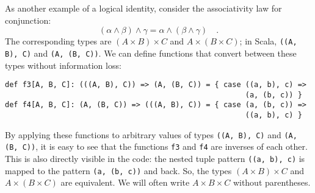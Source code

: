 As another example of a logical identity, consider the associativity
law for conjunction:
\begin{equation}
\left(\alpha\wedge\beta\right)\wedge\gamma=\alpha\wedge\left(\beta\wedge\gamma\right)\quad.\label{eq:ch-example-associativity-conjunction}
\end{equation}
The corresponding types are $(A\times B)\times C$ and $A\times(B\times C)$;
in Scala, \lstinline!((A, B), C)! and \lstinline!(A, (B, C))!. We
can define functions that convert between these types without information
loss:
\begin{lstlisting}
def f3[A, B, C]: (((A, B), C)) => (A, (B, C)) = { case ((a, b), c) =>
                                                       (a, (b, c)) }
def f4[A, B, C]: (A, (B, C)) => (((A, B), C)) = { case (a, (b, c)) =>
                                                       ((a, b), c) }
\end{lstlisting}
By applying these functions to arbitrary values of types \lstinline!((A, B), C)!
and \lstinline!(A, (B, C))!, it is easy to see that the functions
\lstinline!f3! and \lstinline!f4! are inverses of each other. This
is also directly visible in the code: the nested tuple pattern \lstinline!((a, b), c)!
is mapped to the pattern \lstinline!(a, (b, c))! and back. So, the
types $\left(A\times B\right)\times C$ and $A\times\left(B\times C\right)$
are equivalent. We will often write $A\times B\times C$ without parentheses.

